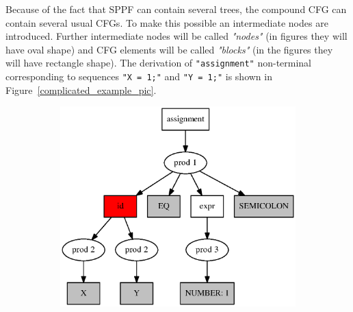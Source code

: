 Because of the fact that SPPF can contain several trees, the compound CFG can contain several usual CFGs. To make this possible an intermediate nodes are introduced. Further intermediate nodes will be called \textit{"nodes"} (in figures they will have oval shape) and CFG elements will be called \textit{"blocks"} (in the figures they will have rectangle shape). The derivation of \verb|"assignment"| non-terminal corresponding to sequences \verb|"X = 1;"| and \verb|"Y = 1;"| is shown in Figure~\ref{complicated_example_pic}. 

\begin{figure}[h!]
    \begin{center}
    \begin{subfigure}{0.3\textwidth}    
        \includegraphics[scale=0.3]{Graphs/cfg_idea_complicated.eps}    
    \caption{}
    \label{complicated_a}
    \end{subfigure}
    \begin{subfigure}{0.1\textwidth}      

\end{subfigure}
\end{center}
\end{figure}
